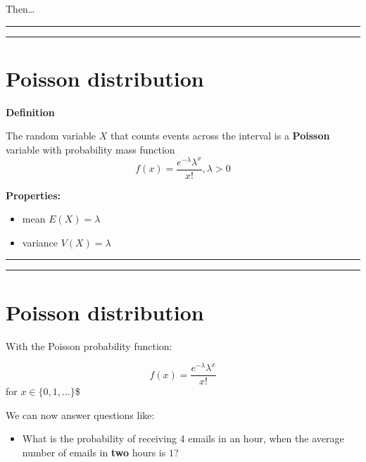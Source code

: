 \documentclass[
]{book}
\providecommand{\tightlist}{%
  \setlength{\itemsep}{0pt}\setlength{\parskip}{0pt}}
\begin{document}
Then\ldots{}

\begin{center}\rule{0.5\linewidth}{0.5pt}\end{center}

\begin{center}\rule{0.5\linewidth}{0.5pt}\end{center}

\hypertarget{poisson-distribution-3}{%
\section{Poisson distribution}\label{poisson-distribution-3}}

\textbf{Definition}

The random variable \(X\) that counts events across the interval is a \textbf{Poisson} variable with probability mass function\\
\[f(x)= \frac{e^{-\lambda}\lambda^x}{x!}, \lambda>0\]

\textbf{Properties:}

\begin{itemize}
\tightlist
\item
  mean \(E(X)= \lambda\)
\item
  variance \(V(X)= \lambda\)
\end{itemize}

\begin{center}\rule{0.5\linewidth}{0.5pt}\end{center}

\begin{center}\rule{0.5\linewidth}{0.5pt}\end{center}

\hypertarget{poisson-distribution-4}{%
\section{Poisson distribution}\label{poisson-distribution-4}}

With the Poisson probability function:

\[f(x)= \frac{e^{-\lambda}\lambda^x}{x!}\] for \(x \in \{0, 1, ...\}\)\$

We can now answer questions like:

\begin{itemize}
\tightlist
\item
  What is the probability of receiving 4 emails in an hour, when the average number of emails in \textbf{two} hours is \(1\)?
\end{itemize}
\end{document}

